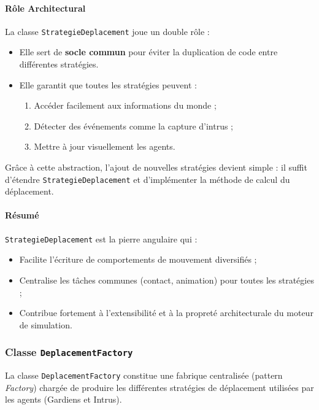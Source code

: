 \vspace{1em}
\paragraph{Rôle Architectural}

La classe \texttt{StrategieDeplacement} joue un double rôle :
\begin{itemize}
    \item Elle sert de \textbf{socle commun} pour éviter la duplication de code entre différentes stratégies.
    \item Elle garantit que toutes les stratégies peuvent :
    \begin{enumerate}
        \item Accéder facilement aux informations du monde ;
        \item Détecter des événements comme la capture d’intrus ;
        \item Mettre à jour visuellement les agents.
    \end{enumerate}
\end{itemize}

Grâce à cette abstraction, l’ajout de nouvelles stratégies devient simple : il suffit d’étendre \texttt{StrategieDeplacement} et d’implémenter la méthode de calcul du déplacement.

\bigskip
\paragraph{Résumé}
\texttt{StrategieDeplacement} est la pierre angulaire qui :
\begin{itemize}
    \item Facilite l’écriture de comportements de mouvement diversifiés ;
    \item Centralise les tâches communes (contact, animation) pour toutes les stratégies ;
    \item Contribue fortement à l’extensibilité et à la propreté architecturale du moteur de simulation.
\end{itemize}

\subsubsection{ Classe \texttt{DeplacementFactory}}

La classe \texttt{DeplacementFactory} constitue une fabrique centralisée (pattern \textit{Factory}) chargée de produire les différentes stratégies de déplacement utilisées par les agents (Gardiens et Intrus).

